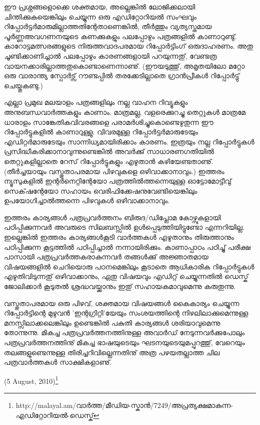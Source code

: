 ഈ പ്രശ്നങ്ങളൊക്കെ ശക്തമായ, അല്ലെങ്കില്‍ ലോജിക്കലായി ചിന്തിക്കുകയെങ്കിലും ചെയ്യുന്ന ഒരു എഡിറ്റോറിയല്‍ 
സംഘവും റിപ്പോര്‍ട്ടര്‍മാരുമില്ലാത്തതിന്റേതാണെങ്കില്‍, തീര്‍ത്തും വ്യത്യസ്തമായ പൂര്‍ണ്ണഅവഗണനയുടെ കണക്കുകളും 
പലപ്പോഴും പത്രങ്ങളില്‍ കാണാറുണ്ടു്. കാറോട്ടമത്സരങ്ങളുടെ നിരുത്തവാദപരമായ റിപ്പോര്‍ട്ടിംഗ് ഒരുദാഹരണം. അതു 
ചൂണ്ടിക്കാണിച്ചാല്‍ പലപ്പോഴും കാരണങ്ങളായി പറയുന്നതു്, വേണ്ടത്ര വായനക്കാരില്ലാത്തതുകൊണ്ടാണെന്നാണു്. 
(ഈയടുത്തു്, അമൃതയിലോ മറ്റോ ഒരു വാരാന്ത്യ സ്പോര്‍ട്സ് റൗണ്ടപ്പില്‍ തരക്കേടില്ലാതെ ഗ്രാന്‍പ്രീകള്‍ 
റിപ്പോര്‍ട്ടു് ചെയ്തുകണ്ടു.)

എല്ലാ പ്രമുഖ മലയാളം പത്രങ്ങളിലും നല്ല വാഹന റിവ്യൂകളും അനുബന്ധവാര്‍ത്തകളും കാണാം. മാത്രമല്ല, വളരെക്കുറച്ചു 
തെറ്റുകള്‍ മാത്രമേ ധാരാളം സാങ്കേതികവിവരങ്ങളെ പരാമര്‍ശിച്ചുകൊണ്ടെഴുതുന്ന ഈ റിപ്പോര്‍ട്ടുകളില്‍ കാണാറുള്ളു. 
വിവരമുള്ള റിപ്പോര്‍ട്ടര്‍മാരുടേയും എഡിറ്റര്‍മാരുടേയും സാന്നിധ്യമായിരിക്കാം കാരണം. ഇത്രയും നല്ല റിപ്പോര്‍ട്ടുകള്‍ 
പ്രസിദ്ധീകരിക്കാനാവുന്നുണ്ടെങ്കില്‍ അവര്‍ക്കു് സാധാരണഗതിയില്‍ തെറ്റുകളില്ലാതെ റേസ് റിപ്പോര്‍ട്ടുകളും എഴുതാന്‍ 
കഴിയേണ്ടതാണു്. (തീര്‍ച്ചയായും വസ്തുതാപരമായ പിഴവുകളെ ഒഴിവാക്കാനാവും.) ഇത്തരം ന്യൂസുകളില്‍ ഇന്റര്‍നെറ്റിന്റേയോ പത്രത്തില്‍ത്തന്നെയുള്ള 
ഓട്ടോമോട്ടീവു് സെക്‌ഷന്റേയോ സഹായം വെരിഫിക്കേഷനുവേണ്ടിയെങ്കിലും ഉപയോഗിച്ചാല്‍ത്തന്നെ പിഴവുകള്‍ 
ഒഴിവാക്കാനാവും.

ഇത്തരം കാര്യങ്ങള്‍ പത്രപ്രവര്‍ത്തനം ബിരുദ/ഡിപ്ലോമ കോഴ്സുകളായി പഠിപ്പിക്കുന്നവര്‍ അവരുടെ സിലബസ്സില്‍ 
ഉള്‍പ്പെടുത്തിയിട്ടുണ്ടോ എന്നറിയില്ല. ഇല്ലെങ്കില്‍ ഇത്തരം കാര്യങ്ങള്‍കൂടി വാര്‍ത്തകള്‍ എഴുതാനും തിരുത്താനും 
പഠിപ്പിക്കുന്ന കൂട്ടത്തില്‍ പഠിപ്പിച്ചാല്‍ നന്നായിരിക്കും. കാണാപ്പാഠം പഠിച്ചു് പരീക്ഷ പാസായി പത്രപ്രവര്‍ത്തകരാകുന്നവര്‍
തങ്ങള്‍ക്കു് അജ്ഞാതമായ വിഷയങ്ങളില്‍ ചെറിയൊരു പഠനമെങ്കിലും കൂടാതെ ആധികാരിക റിപ്പോര്‍ട്ടുകള്‍ 
എഴുതിവിടുന്നതു് ഒഴിവാക്കാനും, ഏതു വിഷയവും എഡിറ്റ് ചെയ്യുന്നതില്‍ ഡെസ്ക് ജോലിക്കാര്‍ കൂടുതല്‍ ശ്രദ്ധവയ്ക്കാനും 
ഇതു് സഹായകമാവുമെന്നു കരുതുന്നു.

വസ്തുതാപരമായ ഒരു പിഴവ്, ശക്തമായ വിഷയങ്ങള്‍ കൈകാര്യം ചെയ്യുന്ന റിപ്പോര്‍ട്ടിന്റെ മുഴുവന്‍ 'ഇന്റഗ്രിറ്റി'യേയും 
സംശയത്തിന്റെ നിഴലിലാക്കുമെന്നുള്ള മനസ്സിലാക്കലെങ്കിലും ഉണ്ടെങ്കില്‍ പകുതി കാര്യങ്ങള്‍ ശരിയാവുമെന്നു തോന്നുന്നു. 
മികച്ച പത്രപ്രവര്‍ത്തനത്തിനുള്ള അവാര്‍ഡ് നേടുന്നവര്‍ക്കുപോലും പത്രപ്രവര്‍ത്തനത്തിനു് മികച്ച ഭാഷയുടെയും 
ഘടനയുടെയുമപ്പുറത്തു്, വേറെയും തലങ്ങളുണ്ടെന്നുള്ള തിരിച്ചറിവില്ലെന്നതിനു് അത്ര പഴയതല്ലാത്ത ചില 
പത്രവാര്‍ത്തകള്‍ സാക്ഷികളാണു്.

\begin{flushright}(5 August, 2010)\footnote{http://malayal.am/വാര്‍ത്ത/മീഡിയ-സ്കാന്‍/7249/അപ്രത്യക്ഷമാകുന്ന-എഡിറ്റോറിയല്‍-ഡെസ്ക്}\end{flushright}

\newpage
